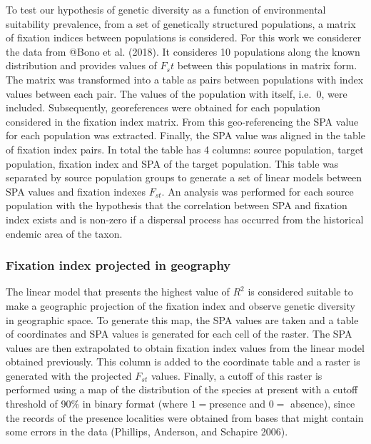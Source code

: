 \documentclass[
]{article}
\begin{document}
To test our hypothesis of genetic diversity as a function of
environmental suitability prevalence, from a set of genetically
structured populations, a matrix of fixation indices between populations
is considered. For this work we considerer the data from @Bono et al.
(2018). It consideres 10 populations along the known distribution and
provides values of \(F_st\) between this populations in matrix form. The
matrix was transformed into a table as pairs between populations with
index values between each pair. The values of the population with
itself, i.e.~\(0\), were included. Subsequently, georeferences were
obtained for each population considered in the fixation index matrix.
From this geo-referencing the SPA value for each population was
extracted. Finally, the SPA value was aligned in the table of fixation
index pairs. In total the table has 4 columns: source population, target
population, fixation index and SPA of the target population. This table
was separated by source population groups to generate a set of linear
models between SPA values and fixation indexes \(F_{st}\). An analysis
was performed for each source population with the hypothesis that the
correlation between SPA and fixation index exists and is non-zero if a
dispersal process has occurred from the historical endemic area of the
taxon.

\hypertarget{fixation-index-projected-in-geography}{%
\subsubsection{Fixation index projected in
geography}\label{fixation-index-projected-in-geography}}

The linear model that presents the highest value of \(R^2\) is
considered suitable to make a geographic projection of the fixation
index and observe genetic diversity in geographic space. To generate
this map, the SPA values are taken and a table of coordinates and SPA
values is generated for each cell of the raster. The SPA values are then
extrapolated to obtain fixation index values from the linear model
obtained previously. This column is added to the coordinate table and a
raster is generated with the projected \(F_{st}\) values. Finally, a
cutoff of this raster is performed using a map of the distribution of
the species at present with a cutoff threshold of 90\% in binary format
(where \(1 =\)presence and \(0 =\) absence), since the records of the
presence localities were obtained from bases that might contain some
errors in the data (Phillips, Anderson, and Schapire 2006).
\end{document}
